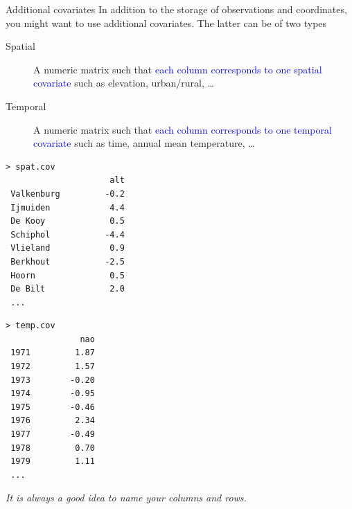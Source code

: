 \documentclass[blackslide,style=simple]{powerdot}
\theoremstyle{plain}%
\theoremstyle{definition}
\theoremstyle{remark}
\newcommand{\advice}[1]{\HandPencilLeft{} \emph{#1}}
\begin{document}
\begin{slide}[toc=,method=direct]{Additional covariates}
  In addition to the storage of observations and coordinates, you
  might want to use additional covariates. The latter can be of two
  types
  \begin{description}
  \item[Spatial] A numeric matrix such that \textcolor{blue}{each
      column corresponds to one spatial covariate} such as elevation,
    urban/rural, \ldots
  \item[Temporal] A numeric matrix such that \textcolor{blue}{each
      column corresponds to one temporal covariate} such as time,
    annual mean temperature, \ldots
  \end{description}
{\tiny
  \begin{minipage}[l]{.49\linewidth}
\begin{verbatim}
> spat.cov
                     alt
 Valkenburg         -0.2
 Ijmuiden            4.4
 De Kooy             0.5
 Schiphol           -4.4
 Vlieland            0.9
 Berkhout           -2.5
 Hoorn               0.5
 De Bilt             2.0
 ...
\end{verbatim}
  \end{minipage}%
  \begin{minipage}[r]{.49\linewidth}
\begin{verbatim}
> temp.cov
               nao
 1971         1.87  
 1972         1.57   
 1973        -0.20   
 1974        -0.95   
 1975        -0.46   
 1976         2.34   
 1977        -0.49   
 1978         0.70   
 1979         1.11   
 ...
\end{verbatim}
  \end{minipage}  
}

\advice{It is always a good idea to name your columns and rows.}
\end{slide}
\end{document}

